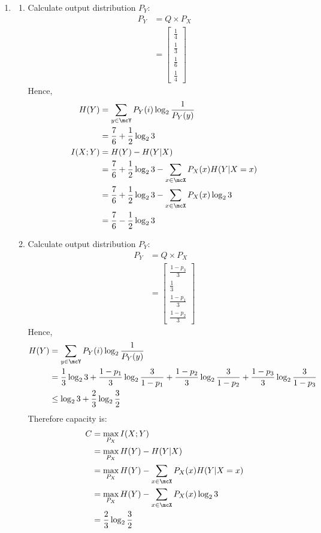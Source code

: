 \documentclass[12pt, a4paper]{article}
\begin{document}
\begin{enumerate}
  \item 
    \begin{enumerate}
      \item Calculate output distribution $P_Y$:
      \begin{align*}
        P_Y &= Q \times P_X \\
            &= \begin{bmatrix}\frac{1}{4}\\\frac{1}{3}\\\frac{1}{6}\\\frac{1}{4}\end{bmatrix}
      \end{align*}
      Hence,
      \begin{align*}
        H(Y) &= \sum_{y\in\mcY}P_Y(i)\log_{2} \frac{1}{P_Y(y)}\\ 
             &= \frac{7}{6} + \frac{1}{2}\log_2 3 \\ 
        I(X;Y) &= H(Y) - H(Y|X)\\ 
               &= \frac{7}{6} + \frac{1}{2}\log_2 3 - \sum_{x\in\mcX}P_X(x)H(Y|X=x)\\
               &= \frac{7}{6} + \frac{1}{2}\log_2 3 - \sum_{x\in\mcX}P_X(x)\log_2 3 \\ 
               &= \frac{7}{6} - \frac{1}{2}\log_2 3
      \end{align*}

      \item Calculate output distribution $P_Y$:
      \begin{align*}
        P_Y &= Q \times P_X \\
            &= \begin{bmatrix}\frac{1-p_3}{3}\\\frac{1}{3}\\\frac{1-p_1}{3}\\\frac{1-p_2}{3}\end{bmatrix}
      \end{align*}
      Hence,
      \begin{align*}
        H(Y) &= \sum_{y\in\mcY}P_Y(i)\log_{2} \frac{1}{P_Y(y)}\\ 
             &= \frac{1}{3}\log_2 3 + \frac{1-p_1}{3}\log_2 \frac{3}{1-p_1} + \frac{1-p_2}{3}\log_2 \frac{3}{1-p_2} + \frac{1-p_3}{3}\log_2 \frac{3}{1-p_3}\\ 
             &\leq \log_2 3 + \frac{2}{3}\log_2 \frac{3}{2}
      \end{align*}
      Therefore capacity is:
      \begin{align*}
        C &= \max_{P_X}I(X;Y)\\ 
          &= \max_{P_X}H(Y) - H(Y|X)\\ 
          &= \max_{P_X}H(Y) - \sum_{x\in\mcX}P_X(x)H(Y|X=x)\\ 
          &= \max_{P_X}H(Y) - \sum_{x\in\mcX}P_X(x)\log_2 3\\ 
          &= \frac{2}{3}\log_2 \frac{3}{2}
      \end{align*}
    \end{enumerate}


\end{enumerate}
\end{document}
